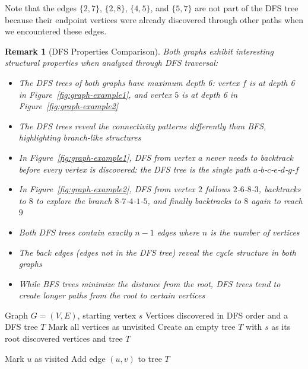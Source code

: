 \documentclass{article}
\newtheorem{remark}{Remark}
\theoremstyle{definition}
\begin{document}
Note that the edges $\{2, 7\}$, $\{2, 8\}$, $\{4, 5\}$, and $\{5, 7\}$ are not part of the DFS tree because their endpoint vertices 
were already discovered through other paths when we encountered these edges.

\begin{remark}[DFS Properties Comparison]
Both graphs exhibit interesting structural properties when analyzed through DFS traversal:
\begin{itemize}
\item The DFS trees of both graphs have maximum depth 6: vertex $f$ is at depth 6 in Figure~\ref{fig:graph-example1}, and vertex $5$ is at depth 6 in Figure~\ref{fig:graph-example2}
\item The DFS trees reveal the connectivity patterns differently than BFS, highlighting branch-like structures
\item In Figure~\ref{fig:graph-example1}, DFS from vertex $a$ never needs to backtrack before every vertex is discovered: the DFS tree is the single path $a$-$b$-$c$-$e$-$d$-$g$-$f$
\item In Figure~\ref{fig:graph-example2}, DFS from vertex $2$ follows $2$-$6$-$8$-$3$, backtracks to $8$ to explore the branch $8$-$7$-$4$-$1$-$5$, and finally backtracks to $8$ again to reach $9$
\item Both DFS trees contain exactly $n-1$ edges where $n$ is the number of vertices
\item The back edges (edges not in the DFS tree) reveal the cycle structure in both graphs
\item While BFS trees minimize the distance from the root, DFS trees tend to create longer paths from the root to certain vertices
\end{itemize}
\end{remark}

\begin{algorithm}
\caption{Depth-First Search (DFS) - Recursive}
\begin{algorithmic}[1]
\Require Graph $G = (V, E)$, starting vertex $s$
\Ensure Vertices discovered in DFS order and a DFS tree $T$
    \State Mark all vertices as unvisited
    \State Create an empty tree $T$ with $s$ as its root
    \State {}
    \State \Return discovered vertices and tree $T$
\EndProcedure

    \State Mark $u$ as visited
            \State Add edge $(u,v)$ to tree $T$
            \State {}
        \EndIf
    \EndFor
\EndProcedure
\end{algorithmic}
\end{algorithm}
\end{document}
